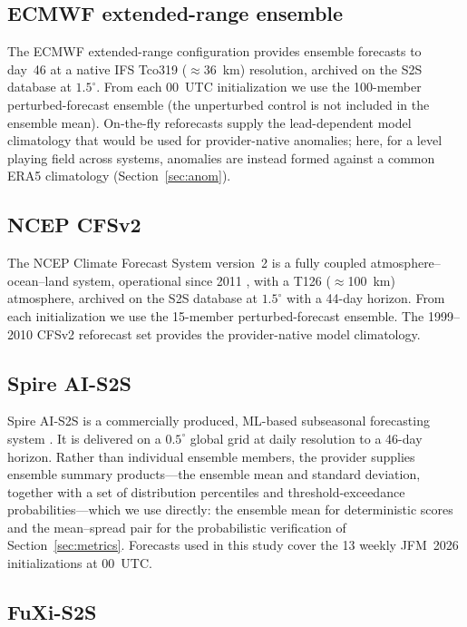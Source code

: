 \documentclass[11pt]{article}
\begin{document}
\subsection{ECMWF extended-range ensemble}\label{sec:ecmwf}

The ECMWF extended-range configuration \citep{vitart2014} provides
ensemble forecasts to day~46 at a native IFS Tco319 ($\approx$36~km)
resolution, archived on the S2S database at $1.5^{\circ}$. From each
00~UTC initialization we use the 100-member perturbed-forecast ensemble
(the unperturbed control is not included in the ensemble mean).
On-the-fly reforecasts supply the lead-dependent model climatology that
would be used for provider-native anomalies; here, for a level playing
field across systems, anomalies are instead formed against a common ERA5
climatology (Section~\ref{sec:anom}).

\subsection{NCEP CFSv2}\label{sec:ncep}

The NCEP Climate Forecast System version~2 is a fully coupled
atmosphere--ocean--land system, operational since 2011
\citep{saha2014}, with a T126 ($\approx$100~km) atmosphere, archived on
the S2S database at $1.5^{\circ}$ with a 44-day horizon. From each
initialization we use the 15-member perturbed-forecast ensemble. The
1999--2010 CFSv2 reforecast set provides the provider-native model
climatology.

\subsection{Spire AI-S2S}\label{sec:spire}

Spire AI-S2S is a commercially produced, ML-based subseasonal
forecasting system \citep{spire2026}. It is delivered on a
$0.5^{\circ}$ global grid at daily resolution to a 46-day horizon. Rather
than individual ensemble members, the provider supplies ensemble summary
products---the ensemble mean and standard deviation, together with a set
of distribution percentiles and threshold-exceedance probabilities---which
we use directly: the ensemble mean for deterministic scores and the
mean--spread pair for the probabilistic verification of
Section~\ref{sec:metrics}. Forecasts used in this study cover the 13
weekly JFM~2026 initializations at 00~UTC.

\subsection{FuXi-S2S}\label{sec:fuxi}
\end{document}
